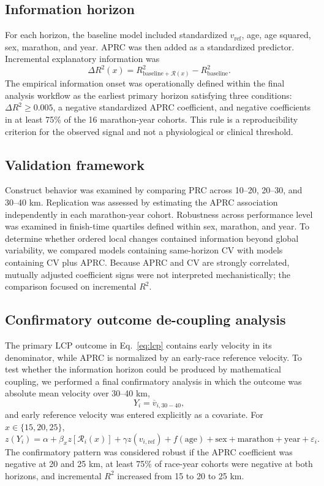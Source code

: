 \documentclass[pdflatex,sn-basic]{sn-jnl}
\begin{document}
\subsection{Information horizon}
For each horizon, the baseline model included standardized $v_{\mathrm{ref}}$, age, age squared, sex, marathon, and year. APRC was then added as a standardized predictor. Incremental explanatory information was
\begin{equation}
\Delta R^2(x)=R^2_{\mathrm{baseline}+\mathcal R(x)}
-R^2_{\mathrm{baseline}}.
\end{equation}
The empirical information onset was operationally defined within the final analysis workflow as the earliest primary horizon satisfying three conditions: $\Delta R^2\ge0.005$, a negative standardized APRC coefficient, and negative coefficients in at least 75\% of the 16 marathon-year cohorts. This rule is a reproducibility criterion for the observed signal and not a physiological or clinical threshold.

\subsection{Validation framework}
Construct behavior was examined by comparing PRC across 10--20, 20--30, and 30--40 km. Replication was assessed by estimating the APRC association independently in each marathon-year cohort. Robustness across performance level was examined in finish-time quartiles defined within sex, marathon, and year. To determine whether ordered local changes contained information beyond global variability, we compared models containing same-horizon CV with models containing CV plus APRC. Because APRC and CV are strongly correlated, mutually adjusted coefficient signs were not interpreted mechanistically; the comparison focused on incremental $R^2$.

\subsection{Confirmatory outcome de-coupling analysis}
The primary LCP outcome in Eq.~\ref{eq:lcp} contains early velocity in its denominator, while APRC is normalized by an early-race reference velocity. To test whether the information horizon could be produced by mathematical coupling, we performed a final confirmatory analysis in which the outcome was absolute mean velocity over 30--40 km,
\begin{equation}
Y_i=\overline v_{i,30-40},
\end{equation}
and early reference velocity was entered explicitly as a covariate. For $x\in\{15,20,25\}$,
\begin{equation}
z(Y_i)=\alpha+\beta_x z[\mathcal R_i(x)]
+\gamma z(v_{i,\mathrm{ref}})
+f(\mathrm{age})+\mathrm{sex}+\mathrm{marathon}+\mathrm{year}+\varepsilon_i.
\end{equation}
The confirmatory pattern was considered robust if the APRC coefficient was negative at 20 and 25 km, at least 75\% of race-year cohorts were negative at both horizons, and incremental $R^2$ increased from 15 to 20 to 25 km.
\end{document}
